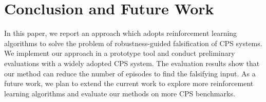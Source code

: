\section{Conclusion and Future Work}\label{sec:conclusion}
In this paper, we report an approach which adopts reinforcement learning algorithms to solve the problem of robustness-guided falsification of CPS systems. We implement our approach in a prototype tool and conduct preliminary evaluations with a widely adopted CPS system. The evaluation results show that our method can reduce the number of episodes to find the falsifying input. As a future work, we plan to extend the current work to explore more reinforcement learning algorithms and evaluate our methods on more CPS benchmarks. 